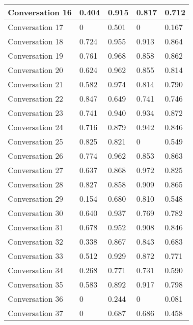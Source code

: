 \begin{table}
\begin{tabular}{|l|l|l|l|l|}
Conversation 16  & 0.404    & 0.915 & 0.817       & 0.712   \\ \hline
Conversation 17  & 0        & 0.501 & 0           & 0.167   \\ \hline
Conversation 18  & 0.724    & 0.955 & 0.913       & 0.864   \\ \hline
Conversation 19  & 0.761    & 0.968 & 0.858       & 0.862   \\ \hline
Conversation 20  & 0.624    & 0.962 & 0.855       & 0.814   \\ \hline
Conversation 21  & 0.582    & 0.974 & 0.814       & 0.790   \\ \hline
Conversation 22  & 0.847    & 0.649 & 0.741       & 0.746   \\ \hline
Conversation 23  & 0.741    & 0.940 & 0.934       & 0.872   \\ \hline
Conversation 24  & 0.716    & 0.879 & 0.942       & 0.846   \\ \hline
Conversation 25  & 0.825    & 0.821 & 0           & 0.549   \\ \hline
Conversation 26  & 0.774    & 0.962 & 0.853       & 0.863   \\ \hline
Conversation 27  & 0.637    & 0.868 & 0.972       & 0.825   \\ \hline
Conversation 28  & 0.827    & 0.858 & 0.909       & 0.865   \\ \hline
Conversation 29  & 0.154    & 0.680 & 0.810       & 0.548   \\ \hline
Conversation 30  & 0.640    & 0.937 & 0.769       & 0.782   \\ \hline
Conversation 31  & 0.678    & 0.952 & 0.908       & 0.846   \\ \hline
Conversation 32  & 0.338    & 0.867 & 0.843       & 0.683   \\ \hline
Conversation 33  & 0.512    & 0.929 & 0.872       & 0.771   \\ \hline
Conversation 34  & 0.268    & 0.771 & 0.731       & 0.590   \\ \hline
Conversation 35  & 0.583    & 0.892 & 0.917       & 0.798   \\ \hline
Conversation 36  & 0        & 0.244 & 0           & 0.081   \\ \hline
Conversation 37  & 0        & 0.687 & 0.686       & 0.458   \\ \hline

\end{tabular}
\end{table}
